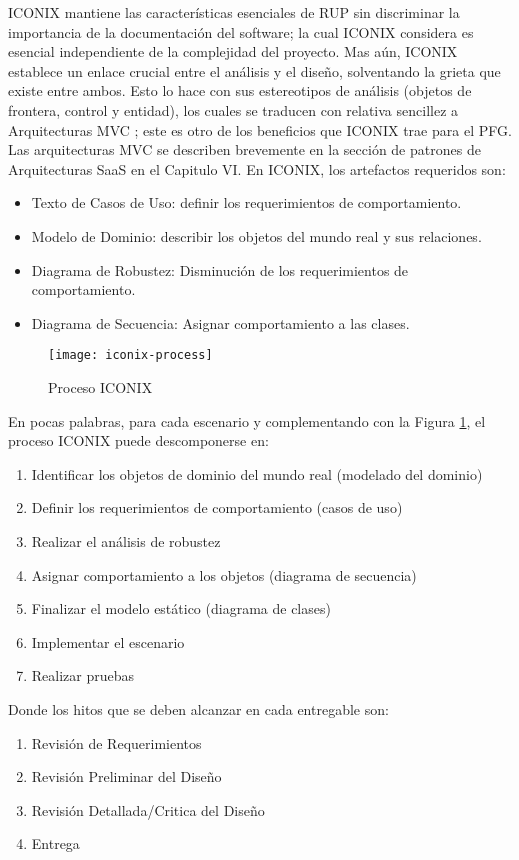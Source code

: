 ICONIX mantiene las características esenciales de RUP sin discriminar la importancia de la documentación del software; la cual ICONIX considera es esencial independiente de la complejidad del proyecto. 
Mas aún, ICONIX establece un enlace crucial entre el análisis y el diseño, solventando la grieta que existe entre ambos. Esto lo hace con sus estereotipos de análisis (objetos de frontera, control y entidad), los cuales se traducen con relativa sencillez a Arquitecturas MVC \cite{Rosen05-ct}; este es otro de los beneficios que ICONIX trae para el PFG. Las arquitecturas MVC se describen brevemente en la sección de patrones de Arquitecturas SaaS en el Capitulo VI. 
En ICONIX, los artefactos requeridos son:
\begin{itemize}
  \item Texto de Casos de Uso: definir los requerimientos de comportamiento.
  \item Modelo de Dominio: describir los objetos del mundo real y sus relaciones.
  \item Diagrama de Robustez: Disminución de los requerimientos de comportamiento.
  \item Diagrama de Secuencia: Asignar comportamiento a las clases.
  
\end{itemize}

\begin{figure}[H]
            \centering
            \texttt{[image: iconix-process]}
            \caption{Proceso ICONIX \protect\cite{Rosen05-ct}}
            \label{fig:iconix-process}
        \end{figure}

En pocas palabras, para cada escenario y complementando con la Figura \ref{fig:iconix-process}, el proceso ICONIX puede descomponerse en:
\begin{enumerate}
    \item Identificar los objetos de dominio del mundo real (modelado del dominio)
    \item Definir los requerimientos de comportamiento (casos de uso)
    \item Realizar el análisis de robustez
    \item Asignar comportamiento a los objetos (diagrama de secuencia)
    \item Finalizar el modelo estático (diagrama de clases)
    \item Implementar el escenario
    \item Realizar pruebas
\end{enumerate}

Donde los hitos que se deben alcanzar en cada entregable son:
\begin{enumerate}
    \item Revisión de Requerimientos
    \item Revisión Preliminar del Diseño
    \item Revisión Detallada/Critica del Diseño
    \item Entrega
\end{enumerate}